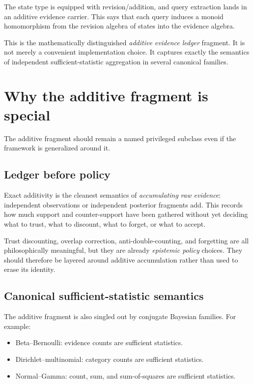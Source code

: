 \documentclass[11pt]{article}
\begin{document}
The state type is equipped with revision/addition, and query extraction lands
in an additive evidence carrier.  This says that each query induces a monoid
homomorphism from the revision algebra of states into the evidence algebra.

This is the mathematically distinguished \emph{additive evidence ledger}
fragment.  It is not merely a convenient implementation choice.  It captures
exactly the semantics of independent sufficient-statistic aggregation in several
canonical families.

\section{Why the additive fragment is special}

The additive fragment should remain a named privileged subclass even if the
framework is generalized around it.

\subsection{Ledger before policy}

Exact additivity is the cleanest semantics of \emph{accumulating raw evidence}:
independent observations or independent posterior fragments add.  This records
how much support and counter-support have been gathered without yet deciding
what to trust, what to discount, what to forget, or what to accept.

Trust discounting, overlap correction, anti-double-counting, and forgetting are
all philosophically meaningful, but they are already \emph{epistemic policy}
choices.  They should therefore be layered around additive accumulation rather
than used to erase its identity.

\subsection{Canonical sufficient-statistic semantics}

The additive fragment is also singled out by conjugate Bayesian families.
For example:
\begin{itemize}
  \item Beta--Bernoulli: evidence counts are sufficient statistics.
  \item Dirichlet--multinomial: category counts are sufficient statistics.
  \item Normal--Gamma: count, sum, and sum-of-squares are sufficient statistics.
\end{itemize}
\end{document}

